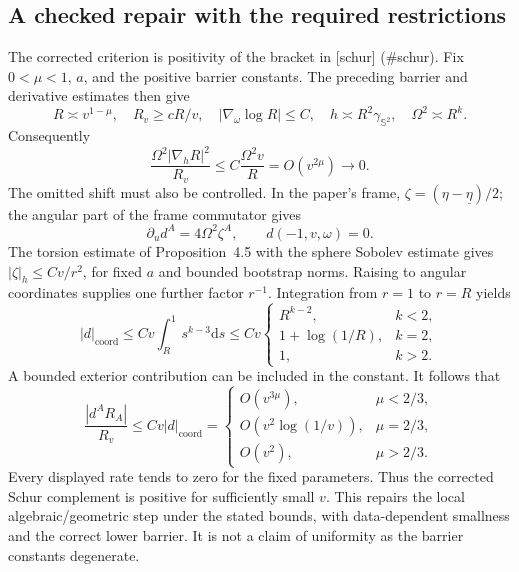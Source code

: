 \documentclass[10pt]{article}
\begin{document}
\subsection*{A checked repair with the required restrictions}
The corrected criterion is positivity of the bracket in [schur] (\#schur). Fix \(0<\mu<1\), \(a\), and the positive barrier constants. The preceding barrier and derivative estimates then give \[R\asymp v^{1-\mu},\quad R_v\ge cR/v,\quad
 |\nabla_\omega\log R|\le C,\quad
 h\asymp R^2\gamma_{\mathbb S^2},\quad \Omega^2\asymp R^k.\] Consequently \[\frac{\Omega^2|\nabla_hR|^2}{R_v}
 \le C\frac{\Omega^2v}{R}=O(v^{2\mu})\longrightarrow0.\] The omitted shift must also be controlled. In the paper’s frame, \(\zeta=(\eta-\underline\eta)/2\); the angular part of the frame commutator gives \[\partial_u d^A=4\Omega^2\zeta^A,\qquad d(-1,v,\omega)=0.\] The torsion estimate of Proposition 4.5 with the sphere Sobolev estimate gives \(|\zeta|_h\le Cv/r^2\), for fixed \(a\) and bounded bootstrap norms. Raising to angular coordinates supplies one further factor \(r^{-1}\). Integration from \(r=1\) to \(r=R\) yields \[|d|_{\mathrm{coord}}\le Cv\int_R^1 s^{k-3}\mathrm ds
 \le C v
 \begin{cases}
 R^{k-2},&k<2,\\
 1+\log(1/R),&k=2,\\
 1,&k>2.
 \end{cases}\] A bounded exterior contribution can be included in the constant. It follows that \[\frac{|d^AR_A|}{R_v}\le Cv|d|_{\mathrm{coord}}
 =
 \begin{cases}
 O(v^{3\mu}),&\mu<2/3,\\
 O(v^2\log(1/v)),&\mu=2/3,\\
 O(v^2),&\mu>2/3.
 \end{cases}\] Every displayed rate tends to zero for the fixed parameters. Thus the corrected Schur complement is positive for sufficiently small \(v\). This repairs the local algebraic/geometric step under the stated bounds, with data-dependent smallness and the correct lower barrier. It is not a claim of uniformity as the barrier constants degenerate.\par
\end{document}
